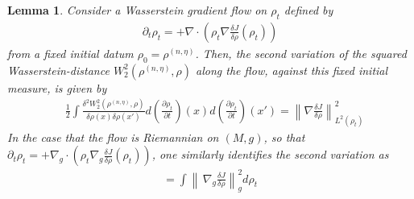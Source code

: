 \documentclass[reqno,11pt,letterpaper]{amsart}
\theoremstyle{plain}
\newtheorem{lemma}{Lemma}
\theoremstyle{definition}
\theoremstyle{remark}
\newcommand{\rgrad}{\nabla_{\!g}}
\newcommand{\wagrad}{\nabla \frac{\delta J}{\delta \rho}}
\begin{document}
\begin{lemma}\label{lemma:Wasserstein_SecondVar}
Consider a Wasserstein gradient flow on $\rho_{t}$ defined by 
\begin{align*}
\partial_{t}\rho_{t} = +\nabla \cdot (\rho_{t} \wagrad (\rho_{t}))
\end{align*}
from a fixed initial datum $\rho_{0} =\rho^{(n, \eta)}$. Then, the second variation of the squared Wasserstein-distance $W_{2}^{2}(\rho^{(n, \eta)}, \rho)$ along the flow, against this fixed initial measure, is given by
\begin{align*}
& \frac{1}{2}\int \frac{\delta^{2} W_{2}^{2}(\rho^{(n, \eta)}, \rho)}{ \delta \rho(x) \delta \rho(x')} d\left(\frac{\partial \rho_{t}}{\partial t}\right)(x)d\left(\frac{\partial \rho_{t}}{\partial t}\right)(x') = \left\lVert \nabla \frac{\delta J}{\delta \rho} \right\rVert_{L^{2}(\rho_{t})}^{2}
\end{align*}
In the case that the flow is Riemannian on $(M, g)$, so that $\partial_{t}\rho_{t} = +\nabla_{g} \cdot (\rho_{t} \nabla_{g} \frac{\delta J}{\delta \rho} (\rho_{t}))$, one similarly identifies the second variation as
\begin{align*}
    = \int \left\lVert \,\rgrad \frac{\delta J}{\delta \rho} \right\rVert_{g}^{2} d \rho_{t}
\end{align*}
\end{lemma}
\end{document}
